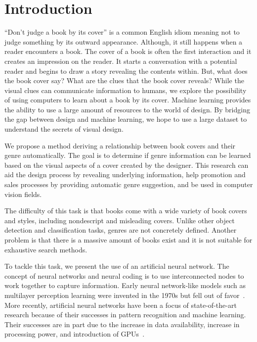 \documentclass[conference]{IEEEtran}
\begin{document}
\section{Introduction}
``Don't judge a book by its cover'' is a common English idiom meaning not to judge something by its outward appearance.
Although, it still happens when a reader encounters a book.
The cover of a book is often the first interaction and it creates an impression on the reader.
It starts a conversation with a potential reader and begins to draw a story revealing the contents within.
But, what does the book cover say?
What are the clues that the book cover reveals?
While the visual clues can communicate information to humans, we explore the possibility of using computers to learn about a book by its cover.
Machine learning provides the ability to use a large amount of resources to the world of design.
By bridging the gap between design and machine learning, we hope to use a large dataset to understand the secrets of visual design.

We propose a method deriving a relationship between book covers and their genre automatically.
The goal is to determine if genre information can be learned based on the visual aspects of a cover created by the designer. 
This research can aid the design process by revealing underlying information, help promotion and sales processes by providing automatic genre suggestion, and be used in computer vision fields.

The difficulty of this task is that books come with a wide variety of book covers and styles, including nondescript and misleading covers.
Unlike other object detection and classification tasks, genres are not concretely defined.
Another problem is that there is a massive amount of books exist and it is not suitable for exhaustive search methods.

To tackle this task, we present the use of an artificial neural network.
The concept of neural networks and neural coding is to use interconnected nodes to work together to capture information.
Early neural network-like models such as multilayer perception learning were invented in the 1970s but fell out of favor~\cite{schmidhuber2015deep}.
More recently, artificial neural networks have been a focus of state-of-the-art research because of their successes in pattern recognition and machine learning.
Their successes are in part due to the increase in data availability, increase in processing power, and introduction of GPUs~\cite{chellapilla2006high}.
\end{document}

